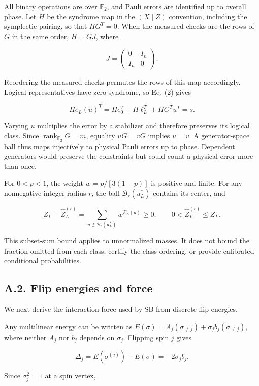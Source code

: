\documentclass[
  10pt,
]{article}
\begin{document}
All binary operations are over \(\mathbb F_2\), and Pauli errors are
identified up to overall phase. Let \(H\) be the syndrome map in the
\((X\mid Z)\) convention, including the symplectic pairing, so that
\(HG^T=0\). When the measured checks are the rows of \(G\) in the same
order, \(H=GJ\), where

\[
J=\begin{pmatrix}0&I_n\\I_n&0\end{pmatrix}.
\]

Reordering the measured checks permutes the rows of this map
accordingly. Logical representatives have zero syndrome, so Eq. (2)
gives

\[
He_L(u)^T=He_0^T+H\ell_L^T+HG^Tu^T=s.
\]

Varying \(u\) multiplies the error by a stabilizer and therefore
preserves its logical class. Since
\(\operatorname{rank}_{\mathbb F_2}G=m\), equality \(uG=vG\) implies
\(u=v\). A generator-space ball thus maps injectively to physical Pauli
errors up to phase. Dependent generators would preserve the constraints
but could count a physical error more than once.

For \(0<p<1\), the weight \(w=p/[3(1-p)]\) is positive and finite. For
any nonnegative integer radius \(r\), the ball \(\mathcal B_r(u_L^*)\)
contains its center, and

\[
Z_L-\widehat Z_L^{(r)}
=\sum_{u\notin\mathcal B_r(u_L^*)}w^{E_L(u)}\ge0,
\qquad 0<\widehat Z_L^{(r)}\le Z_L.
\]

This subset-sum bound applies to unnormalized masses. It does not bound
the fraction omitted from each class, certify the class ordering, or
provide calibrated conditional probabilities.

\subsection{A.2. Flip energies and
force}\label{a.2.-flip-energies-and-force}

We next derive the interaction force used by SB from discrete flip
energies.

Any multilinear energy can be written as
\(E(\sigma)=A_j(\sigma_{\ne j})+\sigma_j b_j(\sigma_{\ne j})\), where
neither \(A_j\) nor \(b_j\) depends on \(\sigma_j\). Flipping spin \(j\)
gives

\[
\Delta_j=E(\sigma^{(j)})-E(\sigma)=-2\sigma_j b_j.
\]

Since \(\sigma_j^2=1\) at a spin vertex,
\end{document}
